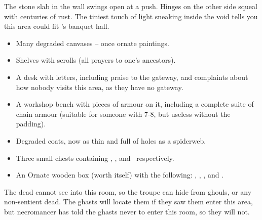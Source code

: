\begin{multicols}{2}
\begin{boxtext}
  The stone slab in the wall swings open at a push.
  Hinges on the other side squeal with centuries of rust.
  The tiniest touch of light sneaking inside the void tells you this area could fit 's banquet hall.
\end{boxtext}

\begin{itemize}
  \item
  Many degraded canvases -- once ornate paintings.
  \item
  Shelves with scrolls (all prayers to one's ancestors).
  \item
  A desk with letters, including praise to the gateway, and complaints about how nobody visits this area, as they have no gateway.
  \item
  A workshop bench with pieces of armour on it, including a complete suite of chain armour (suitable for someone with  7-8, but useless without the padding).
  \item
  Degraded coats, now as thin and full of holes as a spiderweb.
  \item
  Three small chests containing \lootMedium, \lootBig, and \lootBig\ respectively.
  \item
  An Ornate wooden box (worth  itself) with the following: \lootJewellery, \lootJewellery, \lootJewellery, and \lootJewellery.
\end{itemize}

The dead cannot see into this room, so the troupe can hide from ghouls, or any non-sentient dead.
The ghasts will locate them if they saw them enter this area, but \gls{necromancer} has told the ghasts never to enter this room, so they will not.

\end{multicols}
